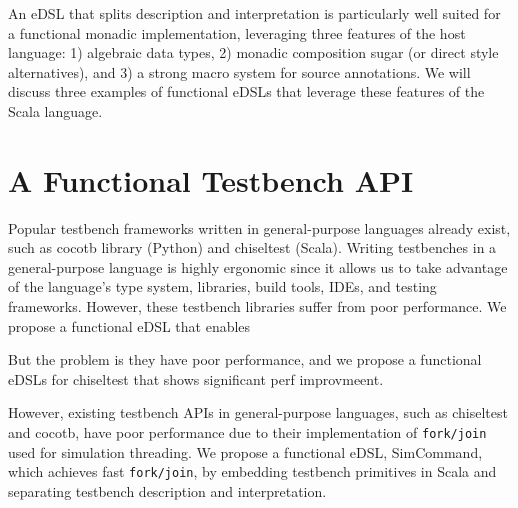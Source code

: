 \documentclass[sigplan,review,nonacm,9pt]{acmart}
\begin{document}
An eDSL that splits description and interpretation is particularly well suited for a functional monadic implementation, leveraging three features of the host language: 1) algebraic data types, 2) monadic composition sugar (or direct style alternatives\cite{dotty_cps_async, koka}), and 3) a strong macro system for source annotations.
We will discuss three examples of functional eDSLs that leverage these features of the Scala language.

\section{A Functional Testbench API}

Popular testbench frameworks written in general-purpose languages already exist, such as cocotb\cite{cocotb} library (Python) and chiseltest\cite{chiseltest} (Scala).
Writing testbenches in a general-purpose language is highly ergonomic since it allows us to take advantage of the language's type system, libraries, build tools, IDEs, and testing frameworks.
However, these testbench libraries suffer from poor performance.
We propose a functional eDSL that enables 

But the problem is they have poor performance, and we propose a functional eDSLs for chiseltest that shows significant perf improvmeent.

However, existing testbench APIs in general-purpose languages, such as chiseltest\cite{chiseltest} and cocotb\cite{cocotb}, have poor performance due to their implementation of \texttt{fork/join} used for simulation threading.
We propose a functional eDSL, SimCommand\cite{simcommand}, which achieves fast \texttt{fork/join}, by embedding testbench primitives in Scala and separating testbench description and interpretation.
\end{document}
